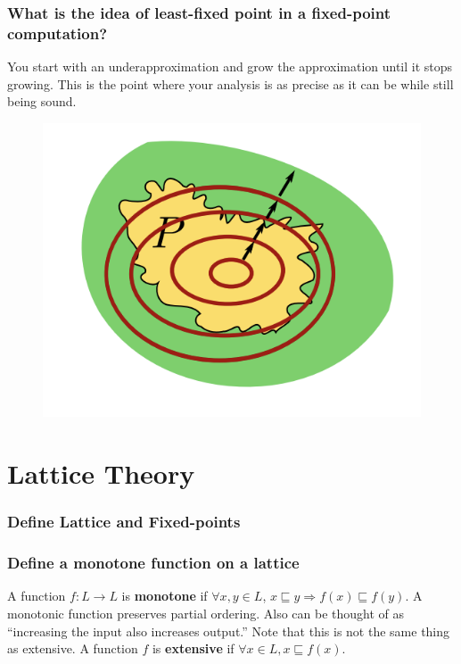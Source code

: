 \documentclass[12pt]{article}
\theoremstyle{remark}
\theoremstyle{remark}
\begin{document}
\subsubsection{What is the idea of least-fixed point in a fixed-point computation?}
You start with an underapproximation and grow the approximation until it stops growing. This is the point where your analysis is as precise as it can be while still being sound.
\begin{figure}[h]
    \centering
    \includegraphics[scale=0.5]{least-fixed-point.png}
\end{figure}

\section{Lattice Theory}
\subsubsection{Define Lattice and Fixed-points}

\subsubsection{Define a monotone function on a lattice}
A function $f: L \to L$ is \textbf{monotone} if $\forall x,y \in L$, $x \sqsubseteq y \Rightarrow f(x) \sqsubseteq f(y)$. A monotonic function preserves partial ordering. Also can be thought of as ``increasing the input also increases output.'' Note that this is not the same thing as extensive. A function $f$ is \textbf{extensive} if $\forall x \in L, x \sqsubseteq f(x)$.
\end{document}
